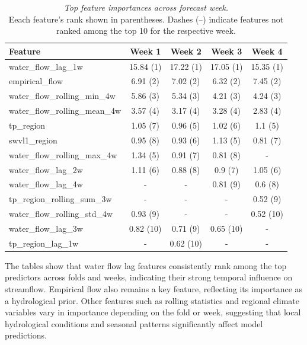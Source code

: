 \documentclass[ruler]{CUP-JNL-EDS}%
\begin{document}
\begin{table}[!htp]
\centering
\begin{tabular}{lcccc}
\hline
\textbf{Feature} & \textbf{Week 1} & \textbf{Week 2} & \textbf{Week 3} & \textbf{Week 4} \\ 
\hline
water\_flow\_lag\_1w & 15.84 (1) & 17.22 (1) & 17.05 (1) & 15.35 (1) \\
empirical\_flow & 6.91 (2) & 7.02 (2) & 6.32 (2) & 7.45 (2) \\
water\_flow\_rolling\_min\_4w & 5.86 (3) & 5.34 (3) & 4.21 (3) & 4.24 (3) \\
water\_flow\_rolling\_mean\_4w & 3.57 (4) & 3.17 (4) & 3.28 (4) & 2.83 (4) \\
tp\_region & 1.05 (7) & 0.96 (5) & 1.02 (6) & 1.1 (5) \\
swvl1\_region & 0.95 (8) & 0.93 (6) & 1.13 (5) & 0.81 (7) \\
water\_flow\_rolling\_max\_4w & 1.34 (5) & 0.91 (7) & 0.81 (8) & - \\
water\_flow\_lag\_2w & 1.11 (6) & 0.88 (8) & 0.9 (7) & 1.05 (6) \\
water\_flow\_lag\_4w & - & - & 0.81 (9) & 0.6 (8) \\
tp\_region\_rolling\_sum\_3w & - & - & - & 0.52 (9) \\
water\_flow\_rolling\_std\_4w & 0.93 (9) & - & - & 0.52 (10) \\
water\_flow\_lag\_3w & 0.82 (10) & 0.71 (9) & 0.65 (10) & - \\
tp\_region\_lag\_1w & - & 0.62 (10) & - & - \\
\hline
\end{tabular}
\caption{\textit{Top feature importances across forecast week.}\\
Eeach feature’s rank shown in parentheses. Dashes (–) indicate features not ranked among the top 10 for the respective week.}
\label{tab:feat_importance_ranks_weeks}   
\end{table}
\noindent The tables show that water flow lag features consistently rank among the top predictors across folds and weeks, indicating their strong temporal influence on streamflow. Empirical flow also remains a key feature, reflecting its importance as a hydrological prior. Other features such as rolling statistics and regional climate variables vary in importance depending on the fold or week, suggesting that local hydrological conditions and seasonal patterns significantly affect model predictions.
\end{document}
